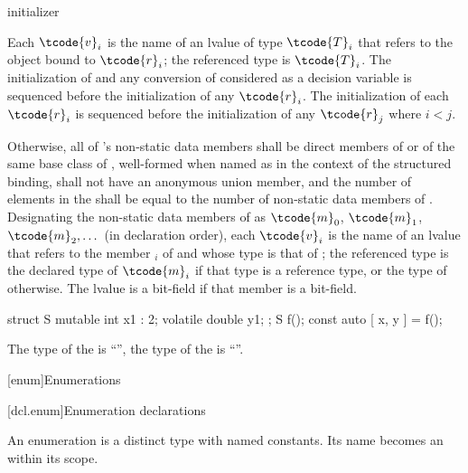\begin{ncbnf}
  initializer \terminal{;}
\end{ncbnf}

Each $\tcode{v}_i$ is the name of an lvalue of type $\tcode{T}_i$
that refers to the object bound to $\tcode{r}_i$;
the referenced type is $\tcode{T}_i$.
The initialization of  and
any conversion of  considered as a decision variable
is
sequenced before the initialization of any $\tcode{r}_i$.
The initialization of each $\tcode{r}_i$ is
sequenced before the initialization of any $\tcode{r}_j$ where $i < j$.

\pnum
Otherwise,
all of 's non-static data members
shall be direct members of  or
of the same base class of ,
well-formed when named as 
in the context of the structured binding,
 shall not have an anonymous union member, and
the number of elements in the  shall be
equal to the number of non-static data members of .
Designating the non-static data members of  as
$\tcode{m}_0$, $\tcode{m}_1$, $\tcode{m}_2, \dotsc$
(in declaration order),
each $\tcode{v}_i$ is the
name of an lvalue that refers to the member $_i$ of  and
whose type is
that of ;
the referenced type is
the declared type of $\tcode{m}_i$ if that type is a reference type, or
the type of  otherwise.
The lvalue is a
bit-field if that member is a bit-field.
\begin{example}
\begin{codeblock}
struct S { mutable int x1 : 2; volatile double y1; };
S f();
const auto [ x, y ] = f();
\end{codeblock}
The type of the   is ``'',
the type of the   is ``''.
\end{example}

[enum]{Enumerations}%

[dcl.enum]{Enumeration declarations}%
%
%

\pnum
An enumeration is a distinct type with named
constants. Its name becomes an  within its scope.

